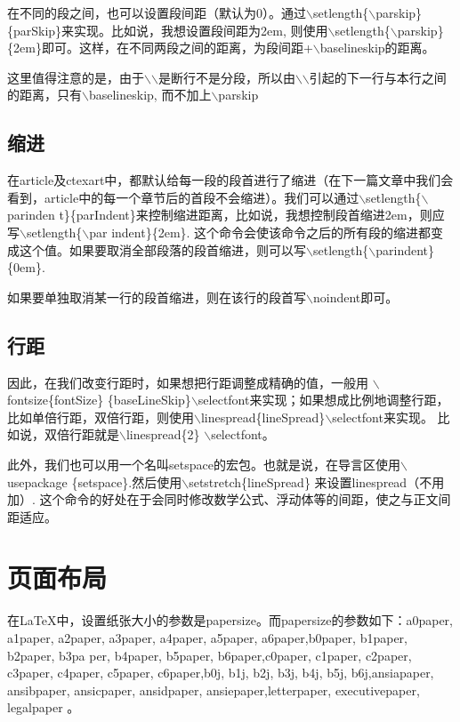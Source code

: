 \documentclass[12pt]{book}
\begin{document}
在不同的段之间，也可以设置段间距（默认为0）。通过$\backslash$setlength\{$\backslash$parskip\}\{parSkip\}来实现。比如说，我想设置段间距为2em, 则使用$\backslash$setlength\{$\backslash$parskip\}\{2em\}即可。这样，在不同两段之间的距离，为段间距+$\backslash$baselineskip的距离。

这里值得注意的是，由于$\backslash$$\backslash$是断行不是分段，所以由$\backslash$$\backslash$引起的下一行与本行之间的距离，只有$\backslash$baselineskip, 而不加上$\backslash$parskip

\subsection{缩进}

在article及ctexart中，都默认给每一段的段首进行了缩进（在下一篇文章中我们会看到，article中的每一个章节后的首段不会缩进）。我们可以通过$\backslash$setlength\{$\backslash$parinden t\}\{parIndent\}来控制缩进距离，比如说，我想控制段首缩进2em，则应写$\backslash$setlength\{$\backslash$par indent\}\{2em\}. 这个命令会使该命令之后的所有段的缩进都变成这个值。如果要取消全部段落的段首缩进，则可以写$\backslash$setlength\{$\backslash$parindent\}\{0em\}.

如果要单独取消某一行的段首缩进，则在该行的段首写$\backslash$noindent即可。

\subsection{行距}

因此，在我们改变行距时，如果想把行距调整成精确的值，一般用 $\backslash$fontsize\{fontSize\} \{baseLineSkip\}$\backslash$selectfont来实现；如果想成比例地调整行距，比如单倍行距，双倍行距，则使用$\backslash$linespread\{lineSpread\}$\backslash$selectfont来实现。 比如说，双倍行距就是$\backslash$linespread\{2\} $\backslash$selectfont。

此外，我们也可以用一个名叫setspace的宏包。也就是说，在导言区使用$\backslash$usepackage \{setspace\}.然后使用$\backslash$setstretch\{lineSpread\} 来设置linespread（不用加\selectfont）. 这个命令的好处在于会同时修改数学公式、浮动体等的间距，使之与正文间距适应。

\section{页面布局}

在\LaTeX{}中，设置纸张大小的参数是papersize。而papersize的参数如下：a0paper, a1paper, a2paper, a3paper, a4paper, a5paper, a6paper,b0paper, b1paper, b2paper, b3pa per, b4paper, b5paper, b6paper,c0paper, c1paper, c2paper, c3paper, c4paper, c5paper, c6paper,b0j, b1j, b2j, b3j, b4j, b5j, b6j,ansiapaper, ansibpaper, ansicpaper, ansidpaper, ansiepaper,letterpaper, executivepaper, legalpaper 。
\end{document}
